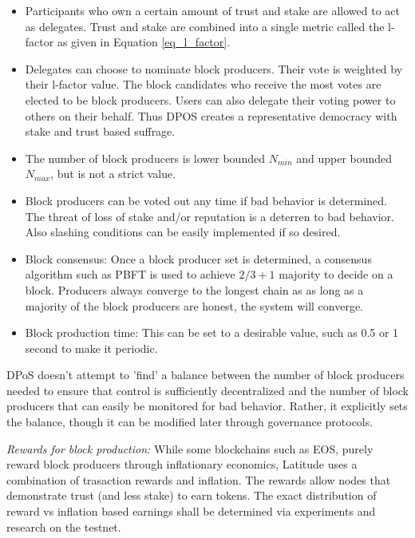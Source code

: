 \begin{itemize}
\item Participants who own a certain amount of trust and stake are allowed to act as delegates. Trust and stake are
    combined into a single metric called the l-factor as given in Equation \ref{eq_l_factor}.
\item Delegates can choose to nominate block producers. Their vote is weighted by their l-factor value. The block
    candidates who receive the most votes are elected to be block producers. Users can also delegate their voting power
        to others on their behalf. Thus DPOS creates a representative democracy with stake and trust based suffrage.
\item The number of block producers is lower bounded $N_{min}$ and upper bounded $N_{max}$, but is not a strict value.

\item Block producers can be voted out any time if bad behavior is determined. The threat of loss of stake and/or
    reputation is a deterren to bad behavior. Also slashing conditions can be easily implemented if so desired.
\item Block consensus: Once a block producer set is determined, a consensus algorithm such as PBFT is used to
    achieve $2/3 +1$ majority to decide on a block. Producers always converge to the longest chain as as long as a
        majority of the block producers are honest, the system will converge.
\item Block production time: This can be set to a desirable value, such as 0.5 or 1 second to make it periodic.
\end{itemize}

DPoS doesn't attempt to 'find' a balance between the number of block producers needed to ensure that control is
sufficiently decentralized and the number of block producers that can easily be monitored for bad behavior. Rather, it
explicitly sets the balance, though it can be modified later through governance protocols.

\noindent
{\em Rewards for block production:} While some blockchains such as EOS, purely reward block producers through inflationary
economics, Latitude uses a combination of trasaction rewards and inflation. The rewards allow nodes that demonstrate
trust (and less stake) to earn tokens. The exact distribution of reward vs inflation based earnings shall be determined
via experiments and research on the testnet.


